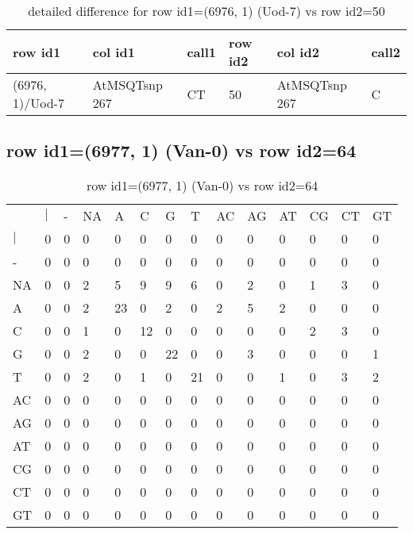 \begin{center}
\begin{longtable}{|l|l|l|l|l|l|}
\caption{detailed difference for row id1=(6976, 1) (Uod-7) vs row id2=50} \label{table_dm201}\\
\hline
row id1&col id1&call1&row id2&col id2&call2\\
\hline
(6976, 1)/Uod-7&AtMSQTsnp 267&CT&50&AtMSQTsnp 267&C\\
\hline
\end{longtable}
\end{center}

\subsection{row id1=(6977, 1) (Van-0) vs row id2=64}
\begin{center}
\begin{longtable}{|l|l|l|l|l|l|l|l|l|l|l|l|l|l|}
\caption{row id1=(6977, 1) (Van-0) vs row id2=64} \label{table_dm202}\\
\hline
\\
\hline
&$|$&-&NA&A&C&G&T&AC&AG&AT&CG&CT&GT\\
$|$&0&0&0&0&0&0&0&0&0&0&0&0&0\\
-&0&0&0&0&0&0&0&0&0&0&0&0&0\\
NA&0&0&2&5&9&9&6&0&2&0&1&3&0\\
A&0&0&2&23&0&2&0&2&5&2&0&0&0\\
C&0&0&1&0&12&0&0&0&0&0&2&3&0\\
G&0&0&2&0&0&22&0&0&3&0&0&0&1\\
T&0&0&2&0&1&0&21&0&0&1&0&3&2\\
AC&0&0&0&0&0&0&0&0&0&0&0&0&0\\
AG&0&0&0&0&0&0&0&0&0&0&0&0&0\\
AT&0&0&0&0&0&0&0&0&0&0&0&0&0\\
CG&0&0&0&0&0&0&0&0&0&0&0&0&0\\
CT&0&0&0&0&0&0&0&0&0&0&0&0&0\\
GT&0&0&0&0&0&0&0&0&0&0&0&0&0\\
\hline
\end{longtable}
\end{center}

